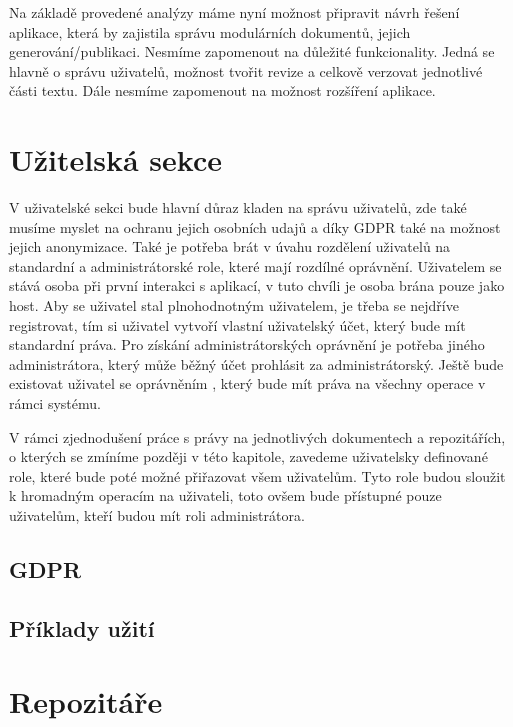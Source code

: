 Na základě provedené analýzy máme nyní možnost připravit návrh řešení aplikace, která by zajistila správu modulárních dokumentů, jejich generování/publikaci.
Nesmíme zapomenout na důležité funkcionality. Jedná se hlavně o správu uživatelů, možnost tvořit revize a celkově verzovat jednotlivé části textu.
Dále nesmíme zapomenout na možnost rozšíření aplikace.

\section{Užitelská sekce}

V uživatelské sekci bude hlavní důraz kladen na správu uživatelů, zde také musíme myslet na ochranu jejich osobních udajů a díky GDPR také na
možnost jejich anonymizace. Také je potřeba brát v úvahu rozdělení uživatelů na standardní a administrátorské role, které mají rozdílné oprávnění.
Uživatelem se stává osoba při první interakci s aplikací, v tuto chvíli je osoba brána pouze jako host. Aby se uživatel stal plnohodnotným uživatelem,
je třeba se nejdříve registrovat, tím si uživatel vytvoří vlastní uživatelský účet, který bude mít standardní práva. Pro získání administrátorských
oprávnění je potřeba jiného administrátora, který může běžný účet prohlásit za administrátorský. Ještě bude existovat uživatel se oprávněním
, který bude mít práva na všechny operace v rámci systému.

V rámci zjednodušení práce s právy na jednotlivých dokumentech a repozitářích, o kterých se zmíníme později v této kapitole, zavedeme uživatelsky
definované role, které bude poté možné přiřazovat všem uživatelům. Tyto role budou sloužit k hromadným operacím na uživateli, toto ovšem bude
přístupné pouze uživatelům, kteří budou mít roli administrátora.

\subsection{GDPR}
\subsection{Příklady užití}

\section{Repozitáře}

